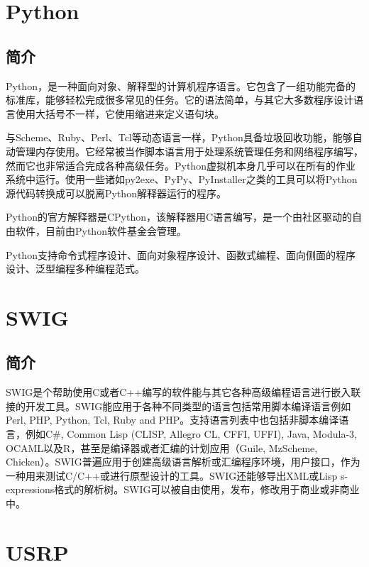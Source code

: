 	\section{Python}
		\subsection{简介}
			\par Python，是一种面向对象、解释型的计算机程序语言。它包含了一组功能完备的标准库，能够轻松完成很多常见的任务。它的语法简单，与其它大多数程序设计语言使用大括号不一样，它使用缩进来定义语句块。
			\par 与Scheme、Ruby、Perl、Tcl等动态语言一样，Python具备垃圾回收功能，能够自动管理内存使用。它经常被当作脚本语言用于处理系统管理任务和网络程序编写，然而它也非常适合完成各种高级任务。Python虚拟机本身几乎可以在所有的作业系统中运行。使用一些诸如py2exe、PyPy、PyInstaller之类的工具可以将Python源代码转换成可以脱离Python解释器运行的程序。
			\par Python的官方解释器是CPython，该解释器用C语言编写，是一个由社区驱动的自由软件，目前由Python软件基金会管理。
			\par Python支持命令式程序设计、面向对象程序设计、函数式编程、面向侧面的程序设计、泛型编程多种编程范式。\cite{ wiki:Python}
	\section{SWIG}
		\subsection{简介}
			\par SWIG是个帮助使用C或者C++编写的软件能与其它各种高级编程语言进行嵌入联接的开发工具。SWIG能应用于各种不同类型的语言包括常用脚本编译语言例如Perl, PHP, Python, Tcl, Ruby and PHP。支持语言列表中也包括非脚本编译语言，例如C\#, Common Lisp (CLISP, Allegro CL, CFFI, UFFI), Java, Modula-3, OCAML以及R，甚至是编译器或者汇编的计划应用（Guile, MzScheme, Chicken）。SWIG普遍应用于创建高级语言解析或汇编程序环境，用户接口，作为一种用来测试C/C++或进行原型设计的工具。SWIG还能够导出XML或Lisp s-expressions格式的解析树。SWIG可以被自由使用，发布，修改用于商业或非商业中。\cite{ wiki:SWIG}
	\section{USRP}
